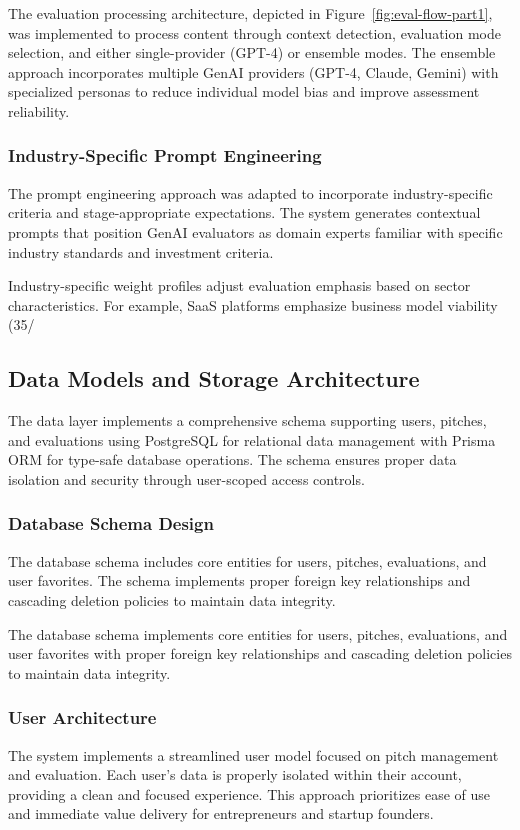 The evaluation processing architecture, depicted in Figure~\ref{fig:eval-flow-part1}, was implemented to process content through context detection, evaluation mode selection, and either single-provider (GPT-4) or ensemble modes. The ensemble approach incorporates multiple GenAI providers (GPT-4, Claude, Gemini) with specialized personas to reduce individual model bias and improve assessment reliability.

\subsubsection{Industry-Specific Prompt Engineering}
The prompt engineering approach was adapted to incorporate industry-specific criteria and stage-appropriate expectations. The system generates contextual prompts that position GenAI evaluators as domain experts familiar with specific industry standards and investment criteria.

Industry-specific weight profiles adjust evaluation emphasis based on sector characteristics. For example, SaaS platforms emphasize business model viability (35/%

\subsection{Data Models and Storage Architecture}\label{subsec:data-models-and-storage-architecture}
The data layer implements a comprehensive schema supporting users, pitches, and evaluations using PostgreSQL for relational data management with Prisma ORM for type-safe database operations. The schema ensures proper data isolation and security through user-scoped access controls.

\subsubsection{Database Schema Design}
The database schema includes core entities for users, pitches, evaluations, and user favorites. The schema implements proper foreign key relationships and cascading deletion policies to maintain data integrity.

The database schema implements core entities for users, pitches, evaluations, and user favorites with proper foreign key relationships and cascading deletion policies to maintain data integrity.

\subsubsection{User Architecture}
The system implements a streamlined user model focused on pitch management and evaluation. Each user's data is properly isolated within their account, providing a clean and focused experience. This approach prioritizes ease of use and immediate value delivery for entrepreneurs and startup founders.

